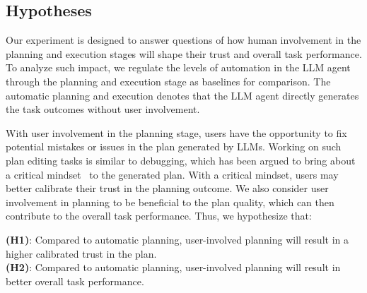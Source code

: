 
\subsection{Hypotheses}
\label{sec:hypo}

Our experiment is designed to answer questions of how human involvement in the planning and execution stages will shape their trust and overall task performance. 
To analyze such impact, we regulate the levels of automation in the %
LLM agent through the planning and execution stage as baselines for comparison. 
The automatic planning and execution denotes that the LLM agent directly generates the task outcomes without user involvement.

With user involvement in the planning stage, users have the opportunity to fix potential mistakes or issues in the plan generated by LLMs. 
Working on such plan editing tasks is similar to debugging, which has been argued to bring about a critical mindset~\cite{he2024err} to the generated plan. 
With a critical mindset, users may better calibrate their trust in the planning outcome. 
We also consider user involvement in planning to be beneficial to the plan quality, which can then contribute to the overall task performance. 
Thus, we hypothesize that:
\begin{framed}
\noindent\textbf{(H1)}: Compared to automatic planning, user-involved planning will result in a higher calibrated  trust {in the plan}.\\
\noindent\textbf{(H2)}: Compared to automatic planning, user-involved planning will result in better overall task performance.
\end{framed}

